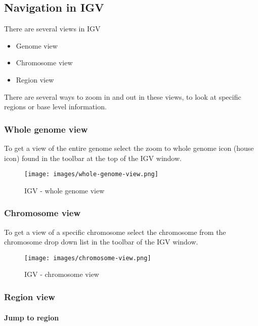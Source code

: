 \documentclass[11pt]{article}
\providecommand{\tightlist}{%
      \setlength{\itemsep}{0pt}\setlength{\parskip}{0pt}}
\begin{document}
    \hypertarget{navigation-in-igv}{%
\subsection{Navigation in IGV}\label{navigation-in-igv}}

There are several views in IGV

\begin{itemize}
\tightlist
\item
  Genome view
\item
  Chromosome view
\item
  Region view
\end{itemize}

There are several ways to zoom in and out in these views, to look at
specific regions or base level information.

    \hypertarget{whole-genome-view}{%
\subsubsection{Whole genome view}\label{whole-genome-view}}

To get a view of the entire genome select the zoom to whole genome icon
(house icon) found in the toolbar at the top of the IGV window.

    \begin{figure}
\centering
\texttt{[image: images/whole-genome-view.png]}
\caption{IGV - whole genome view}
\end{figure}

    \hypertarget{chromosome-view}{%
\subsubsection{Chromosome view}\label{chromosome-view}}

To get a view of a specific chromosome select the chromosome from the
chromosome drop down list in the toolbar of the IGV window.

    \begin{figure}
\centering
\texttt{[image: images/chromosome-view.png]}
\caption{IGV - chromosome view}
\end{figure}

    \hypertarget{region-view}{%
\subsubsection{Region view}\label{region-view}}

\hypertarget{jump-to-region}{%
\paragraph{Jump to region}\label{jump-to-region}}
\end{document}
